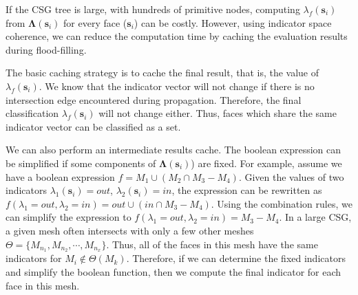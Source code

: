 If the CSG tree is large, with hundreds of primitive nodes, computing $\lambda_f(\bm{s}_i)$ from $\boldsymbol{\Lambda}(\bm{s}_i)$ for every face ($\bm{s}_i$) can be costly. However, using indicator space coherence, we can reduce the computation time by caching the evaluation results during flood-filling.


The basic caching strategy is to cache the final result, that is, the value of $\lambda_f(\bm{s}_i)$. We know that the indicator vector will not change if there is no intersection edge encountered during propagation. Therefore, the final classification $\lambda_f(\bm{s}_i)$ will not change either. Thus, faces which share the same indicator vector can be classified as a set.


We can also perform an intermediate results cache. The boolean expression can be simplified if some components of $\bm{\Lambda}(\bm{s}_i)$) are fixed. For example, assume we have a boolean expression $f = M_1\cup (M_2\cap M_3-M_4)$. Given the values of two indicators $\lambda_1(\bm{s}_i)=out$, $\lambda_2(\bm{s}_i)=in$, the expression can be rewritten as $f(\lambda_1=out, \lambda_2=in)=out\cup (in\cap M_3-M_4)$. Using the combination rules, we can simplify the expression to $f(\lambda_1=out, \lambda_2=in)=M_3-M_4$. In a large CSG, a given mesh often intersects with only a few other meshes $\Theta= \{M_{n_1}, M_{n_2}, \cdots, M_{n_x}\}$. Thus, all of the faces in this mesh have the same indicators for $M_{i} \notin \Theta(M_k)$. Therefore, if we can determine the fixed indicators and simplify the boolean function, then we compute the final indicator for each face in this mesh.


